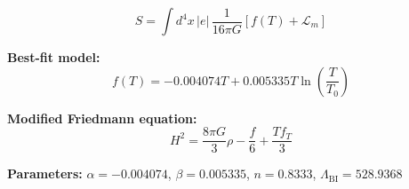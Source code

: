 
\begin{equation}
  S = \int d^4x \, |e| \, \frac{1}{16\pi G} \left[ f(T) + \mathcal{L}_m \right]
\end{equation}

\textbf{Best-fit model:}
\begin{equation}
  f(T) = -0.004074 T + 0.005335 T \ln\!\left(\frac{T}{T_0}\right)
\end{equation}

\textbf{Modified Friedmann equation:}
\begin{equation}
  H^2 = \frac{8\pi G}{3} \rho - \frac{f}{6} + \frac{T f_T}{3}
\end{equation}

\textbf{Parameters:}
$\alpha = -0.004074$, \quad
$\beta = 0.005335$, \quad
$n = 0.8333$, \quad
$\Lambda_{\text{BI}} = 528.9368$